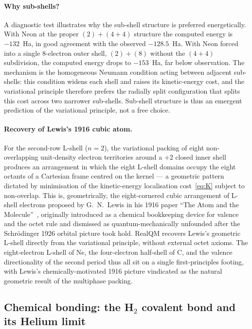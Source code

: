\documentclass[11pt]{article}
\begin{document}
\paragraph{Why sub-shells?}
A diagnostic test illustrates why the sub-shell structure is preferred energetically. With Neon at the proper $(2) + (4{+}4)$ structure the computed energy is $-132$~Ha, in good agreement with the observed $-128.5$~Ha. With Neon forced into a single $8$-electron outer shell, $(2) + (8)$ without the $(4{+}4)$ subdivision, the computed energy drops to $-153$~Ha, far below observation. The mechanism is the homogeneous Neumann condition acting between adjacent sub-shells: this condition widens each shell and raises its kinetic-energy cost, and the variational principle therefore prefers the radially split configuration that splits this cost across two narrower sub-shells. Sub-shell structure is thus an emergent prediction of the variational principle, not a free choice.

\paragraph{Recovery of Lewis's 1916 cubic atom.}
For the second-row L-shell ($n = 2$), the variational packing of eight non-overlapping unit-density electron territories around a $+2$ closed inner shell produces an arrangement in which the eight L-shell domains occupy the eight octants of a Cartesian frame centred on the kernel --- a geometric pattern dictated by minimisation of the kinetic-energy localisation cost~\eqref{eq:K} subject to non-overlap. This is, geometrically, the eight-cornered cubic arrangement of L-shell electrons proposed by G.~N.~Lewis in his 1916 paper ``The Atom and the Molecule''~\cite{Lewis1916}, originally introduced as a chemical bookkeeping device for valence and the octet rule and dismissed as quantum-mechanically unfounded after the Schr\"odinger 1926 orbital picture took hold. RealQM recovers Lewis's geometric L-shell directly from the variational principle, without external octet axioms. The eight-electron L-shell of Ne, the four-electron half-shell of C, and the valence directionality of the second period thus all sit on a single first-principles footing, with Lewis's chemically-motivated 1916 picture vindicated as the natural geometric result of the multiphase packing.

\subsection{Chemical bonding: the H$_2$ covalent bond and its Helium limit}\label{sec:h2bond}
\end{document}
